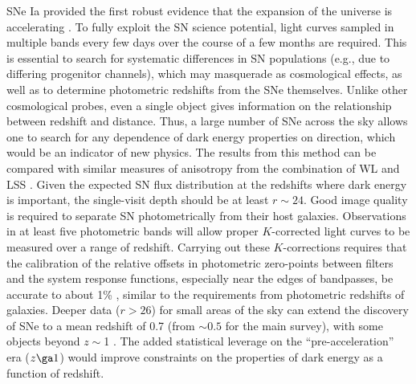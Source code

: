 SNe Ia provided the first robust evidence that the expansion of the
universe is accelerating \citep{1998AJ....116.1009R,1999ApJ...517..565P}. To fully
exploit the SN science potential, light curves sampled in multiple
bands every few days over the course of a few months are required. This is
essential to search for systematic differences in SN populations
(e.g., due to differing progenitor channels), which
may masquerade as cosmological effects, as well as to determine photometric
redshifts from the SNe themselves. Unlike other cosmological probes,
even a single object gives information on the relationship between
redshift and distance.  Thus, a large
number of SNe across the sky allows one to search for any dependence
of dark energy properties on direction, which
would be an indicator of new physics. The results from this method can be compared
with similar measures of anisotropy from the combination of WL and LSS
\citep{2009ApJ...690..923Z}.
Given the expected SN flux distribution
at the redshifts where dark energy is important, the
single-visit depth should be at least $r\sim24$. Good image quality is
required to separate SN photometrically from
their host galaxies. Observations in at least five photometric bands will allow
proper $K$-corrected light curves to be measured over a range of
redshift.  Carrying out these $K$-corrections requires that the
calibration of the relative offsets in photometric zero-points between filters and
the system response functions, especially near the edges of
bandpasses, be accurate to about 1\% \citep{2007ApJ...666..694W},
similar to the requirements from photometric redshifts of galaxies. Deeper data
($r>26$) for small areas of the sky can extend the discovery of SNe to a mean
redshift of 0.7 (from $\sim0.5$ for the main survey), with some objects beyond $z\sim$1
\citep[][SciBook, Chap.~11]{2004AAS...20510818G,2004AAS...20510820P}. The added statistical leverage
on the ``pre-acceleration'' era ($z\ga1$) would improve constraints on the properties of
dark energy as a function of redshift.

